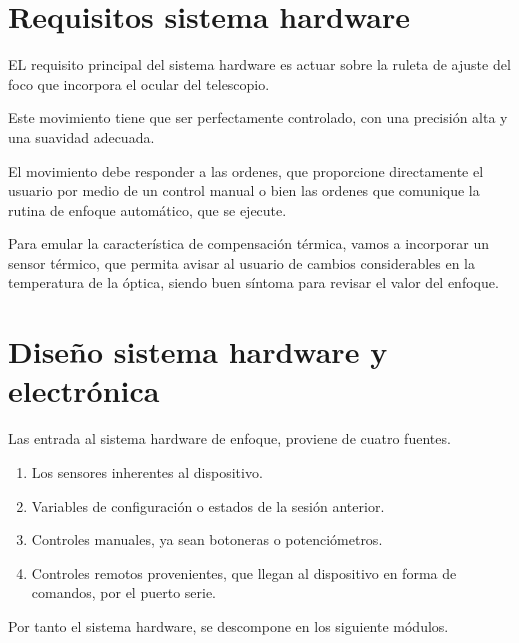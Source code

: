 \section{Requisitos sistema hardware}

EL requisito principal del sistema hardware es actuar sobre la ruleta de ajuste del foco que incorpora el ocular del telescopio. 

Este movimiento tiene que ser perfectamente controlado, con una precisión alta y una suavidad adecuada. 

El movimiento debe responder a las ordenes, que proporcione directamente el usuario por medio de un control manual o bien las ordenes que comunique la rutina de enfoque automático, que se ejecute. 

Para emular la característica de compensación térmica, vamos a incorporar  un sensor térmico, que permita avisar al usuario de cambios considerables en la temperatura de la óptica, siendo buen síntoma para revisar el valor del enfoque.  



\section{Diseño sistema hardware y electrónica}


Las entrada al sistema hardware de enfoque, proviene de cuatro fuentes.

\begin{enumerate}
\item Los sensores inherentes al dispositivo.
\item Variables de configuración o estados de la sesión anterior. 
\item Controles manuales, ya sean botoneras o potenciómetros.
\item Controles remotos provenientes, que llegan al dispositivo en forma de comandos, por el puerto serie.
\end{enumerate}

Por tanto el sistema hardware, se descompone en los siguiente módulos.

